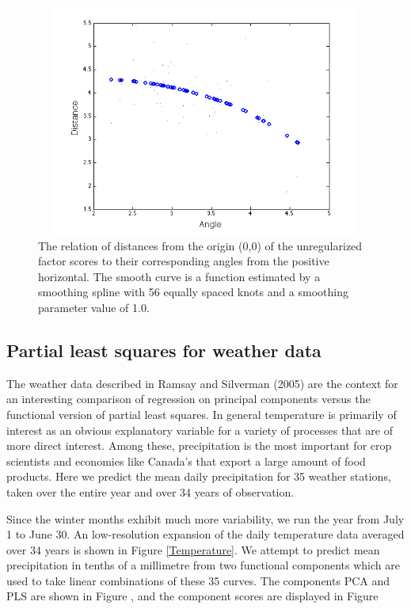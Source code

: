 \documentclass[12pt]{article}
\begin{document}
\begin{figure}
  \includegraphics[height=3in, width=6in]{figs/GrowthFsmooth}
  \caption{The relation of distances from the origin (0,0) of the unregularized factor scores to their corresponding angles from the positive horizontal.  The smooth curve is a function estimated by a smoothing spline with 56 equally spaced knots and a smoothing parameter value of 1.0.}
  \label{GrowthFSmooth}
\end{figure}


\subsection{Partial least squares for weather data}
\label{subsec:PLSweather}

The weather data described in Ramsay and Silverman (2005) are the context for an interesting comparison of regression on principal components versus the functional version of partial least squares.  In general temperature is primarily of interest as an obvious explanatory variable for a variety of processes that are of more direct interest.  Among these, precipitation is the most important for crop scientists and economies like Canada's that export a large amount of food products.  Here we predict the mean daily precipitation for 35 weather stations, taken over the entire year and over 34 years of observation.

Since the winter months exhibit much more variability, we run the year from July 1 to June 30.  An low-resolution expansion of the daily temperature data averaged over 34 years is shown in Figure \ref{Temperature}.  We attempt to predict mean precipitation in tenths of a millimetre from two functional components which are used to take linear combinations of these 35 curves.  The components PCA and PLS are shown in Figure \label{Daily_PCA_PLS_Components}, and the component scores are displayed in Figure \label{Daily_PCA_PLS_Scores.}  
\end{document}

